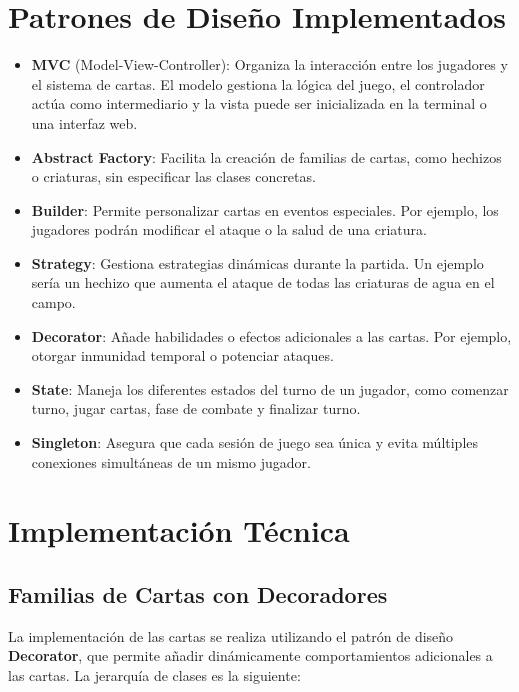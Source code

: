 \documentclass[12pt]{article}
\begin{document}
\section*{Patrones de Diseño Implementados}
\begin{itemize}
    \item \textbf{MVC} (Model-View-Controller): 
    Organiza la interacción entre los jugadores y el sistema de cartas. El modelo gestiona la lógica del juego, el controlador actúa como intermediario y la vista puede ser inicializada en la terminal o una interfaz web.

    \item \textbf{Abstract Factory}: 
    Facilita la creación de familias de cartas, como hechizos o criaturas, sin especificar las clases concretas.

    \item \textbf{Builder}: 
    Permite personalizar cartas en eventos especiales. Por ejemplo, los jugadores podrán modificar el ataque o la salud de una criatura.

    \item \textbf{Strategy}: 
    Gestiona estrategias dinámicas durante la partida. Un ejemplo sería un hechizo que aumenta el ataque de todas las criaturas de agua en el campo.

    \item \textbf{Decorator}: 
    Añade habilidades o efectos adicionales a las cartas. Por ejemplo, otorgar inmunidad temporal o potenciar ataques.

    \item \textbf{State}: 
    Maneja los diferentes estados del turno de un jugador, como comenzar turno, jugar cartas, fase de combate y finalizar turno.

    \item \textbf{Singleton}: 
    Asegura que cada sesión de juego sea única y evita múltiples conexiones simultáneas de un mismo jugador.
\end{itemize}

\section*{Implementación Técnica}

\subsection*{Familias de Cartas con Decoradores}
La implementación de las cartas se realiza utilizando el patrón de diseño \textbf{Decorator}, que permite añadir dinámicamente comportamientos adicionales a las cartas. La jerarquía de clases es la siguiente:
\end{document}
